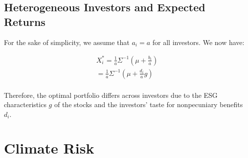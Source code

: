 \subsection{Heterogeneous Investors and Expected Returns}

For the sake of simplicity, we assume that $a_i = a$ for all investors.
We now have:

\begin{equation}
    \begin{aligned}
    X^*_i = \frac{1}{a} \Sigma^{-1}(\mu + \frac{b_i}{a}) \\
    = \frac{1}{a} \Sigma^{-1}(\mu + \frac{d_i}{a}g) \\
    \end{aligned}
\end{equation}

Therefore, the optimal portfolio differs across investors due to the
ESG characteristics $g$ of the stocks and the investors' taste for
nonpecuniary benefits $d_i$. 

\section{Climate Risk}